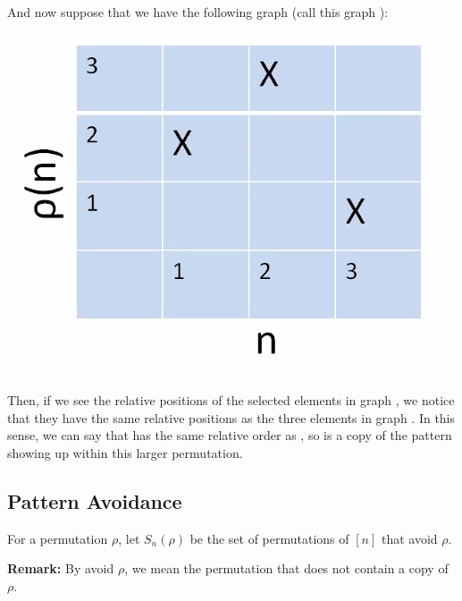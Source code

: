 \documentclass[letterpaper]{article}
\begin{document}
And now suppose that we have the following graph (call this graph ):
\begin{center}
    \includegraphics[scale=0.45]{pattern_perm.PNG}
\end{center}
Then, if we see the relative positions of the selected elements in graph , we notice that they have the same relative positions as the three elements in graph . In this sense, we can say that  has the same relative order as , so  is a copy of the pattern  showing up within this larger permutation. 

\subsection{Pattern Avoidance}
\begin{definition}{}{}
    For a permutation $\rho$, let $S_{n}(\rho)$ be the set of permutations of $[n]$ that avoid $\rho$. 
\end{definition}
\textbf{Remark:} By avoid $\rho$, we mean the permutation that does not contain a copy of $\rho$. 
\end{document}

